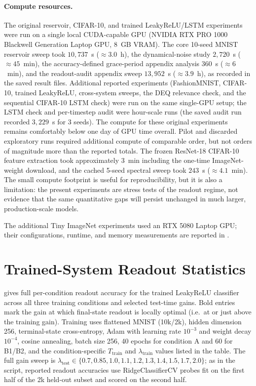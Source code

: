 \documentclass{article}
\theoremstyle{remark}
\begin{document}
\paragraph{Compute resources.}
The original reservoir, CIFAR-10, and trained LeakyReLU/LSTM experiments
were run on a single local CUDA-capable GPU
(NVIDIA RTX PRO 1000 Blackwell Generation Laptop GPU, 8~GB VRAM). The
core 10-seed MNIST reservoir sweep took $10{,}737$~s ($\approx 3.0$~h),
the dynamical-noise study $2{,}720$~s ($\approx 45$~min), the
accuracy-defined grace-period appendix analysis $360$~s ($\approx 6$~min),
and the readout-audit appendix sweep $13{,}952$~s ($\approx 3.9$~h), as
recorded in the saved result files. Additional reported experiments
(FashionMNIST, CIFAR-10, trained LeakyReLU, cross-system sweeps, the DEQ
relevance check, and the sequential CIFAR-10 LSTM check) were run on the same
single-GPU setup; the LSTM check and per-timestep audit were hour-scale runs
(the saved audit run recorded $3{,}229$~s for 3 seeds). The compute for these original experiments
remains comfortably below one day of GPU time overall. Pilot and
discarded exploratory runs required additional compute of comparable order,
but not orders of magnitude more than the reported totals.
The frozen ResNet-18 CIFAR-10 feature extraction took approximately 3~min
including the one-time ImageNet-weight download, and the cached 5-seed
spectral sweep took $243$~s ($\approx4.1$~min).
The small compute footprint is useful for reproducibility, but it is also a
limitation: the present experiments are stress tests of the readout regime,
not evidence that the same quantitative gaps will persist unchanged in much
larger, production-scale models.

The additional Tiny ImageNet experiments used an RTX 5080 Laptop GPU;
their configurations, runtime, and memory measurements are reported in
.

\section{Trained-System Readout Statistics}
\label{app:trained_table}

 gives full per-condition readout accuracy for the trained
LeakyReLU classifier across all three training conditions and selected
test-time gains. Bold entries mark the gain at which final-state
readout is locally optimal (i.e.\ at or just above the training gain).
Training uses flattened MNIST (10k/2k), hidden dimension 256, terminal-state
cross-entropy, Adam with learning rate $10^{-3}$ and weight decay $10^{-4}$,
cosine annealing, batch size 256, 40 epochs for condition A and 60 for
B1/B2, and the condition-specific $T_{\text{train}}$ and
$\lambda_{\text{train}}$ values listed in the table. The full gain sweep is
$\lambda_{\text{test}}\in\{0.7,0.85,1.0,1.1,1.2,1.3,1.4,1.5,1.7,2.0\}$;
as in the script, reported readout accuracies use RidgeClassifierCV probes fit
on the first half of the 2k held-out subset and scored on the second half.
\end{document}
